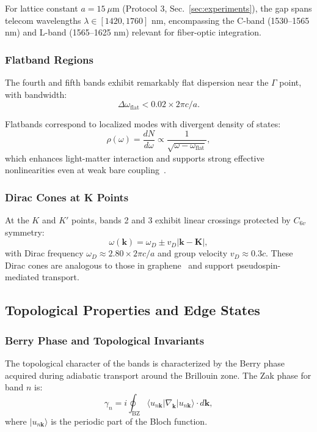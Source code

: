For lattice constant $a = 15~\mu$m (Protocol 3, Sec.~\ref{sec:experiments}), the gap spans telecom wavelengths $\lambda \in [1420, 1760]$ nm, encompassing the C-band (1530--1565 nm) and L-band (1565--1625 nm) relevant for fiber-optic integration.

\subsubsection{Flatband Regions}

The fourth and fifth bands exhibit remarkably flat dispersion near the $\Gamma$ point, with bandwidth:
\begin{equation}
\Delta\omega_{\mathrm{flat}} < 0.02 \times 2\pi c/a.
\end{equation}

Flatbands correspond to localized modes with divergent density of states:
\begin{equation}
\rho(\omega) = \frac{dN}{d\omega} \propto \frac{1}{\sqrt{\omega - \omega_{\mathrm{flat}}}},
\label{eq:flatband_dos}
\end{equation}
which enhances light-matter interaction and supports strong effective nonlinearities even at weak bare coupling~\cite{Leykam2018}.

\subsubsection{Dirac Cones at K Points}

At the $K$ and $K'$ points, bands 2 and 3 exhibit linear crossings protected by $C_{6v}$ symmetry:
\begin{equation}
\omega(\mathbf{k}) = \omega_D \pm v_D |\mathbf{k} - \mathbf{K}|,
\end{equation}
with Dirac frequency $\omega_D \approx 2.80 \times 2\pi c/a$ and group velocity $v_D \approx 0.3c$. These Dirac cones are analogous to those in graphene~\cite{CastroNeto2009} and support pseudospin-mediated transport.

\subsection{Topological Properties and Edge States}

\subsubsection{Berry Phase and Topological Invariants}

The topological character of the bands is characterized by the Berry phase acquired during adiabatic transport around the Brillouin zone. The Zak phase for band $n$ is:
\begin{equation}
\gamma_n = i \oint_{\mathrm{BZ}} \langle u_{n\mathbf{k}} | \nabla_{\mathbf{k}} | u_{n\mathbf{k}} \rangle \cdot d\mathbf{k},
\label{eq:zak}
\end{equation}
where $|u_{n\mathbf{k}}\rangle$ is the periodic part of the Bloch function.

